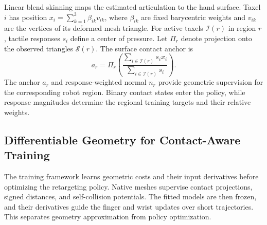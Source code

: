 Linear blend skinning maps the estimated articulation to the hand surface. Taxel $i$ has position $x_i=\sum_{k=1}^{3}\beta_{ik}v_{ik}$, where $\beta_{ik}$ are fixed barycentric weights and $v_{ik}$ are the vertices of its deformed mesh triangle. For active taxels $\mathcal I(r)$ in region $r$, tactile responses $s_i$ define a center of pressure. Let $\Pi_r$ denote projection onto the observed triangles $\mathcal S(r)$. The surface contact anchor is
\begin{equation}
    a_r=\Pi_r\!\left(
        \frac{\sum_{i\in\mathcal I(r)}s_i x_i}{\sum_{i\in\mathcal I(r)}s_i}
        \right).
    \label{eq:cart-anchor}
\end{equation}
The anchor $a_r$ and response-weighted normal $n_r$ provide geometric supervision for the corresponding robot region. Binary contact states enter the policy, while response magnitudes determine the regional training targets and their relative weights.

\subsection{Differentiable Geometry for Contact-Aware Training}
\label{sec:cart-training}

The training framework learns geometric costs and their input derivatives before optimizing the retargeting policy. Native meshes supervise contact projections, signed distances, and self-collision potentials. The fitted models are then frozen, and their derivatives guide the finger and wrist updates over short trajectories. This separates geometry approximation from policy optimization.

